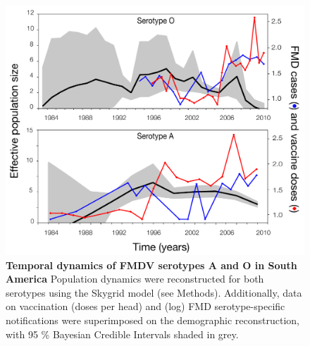 \documentclass[10pt]{article}
\begin{document}
\begin{figure}[!ht]
\begin{center}
\includegraphics[scale=1.0]{FIGURES/skygrid.pdf}
\end{center}
\caption{
{\bf Temporal dynamics of FMDV serotypes A and O in South America} Population dynamics were reconstructed for both serotypes using the Skygrid model (see Methods). Additionally, data on vaccination  (doses per head) and (log) FMD serotype-specific notifications were superimposed on the demographic reconstruction, with 95 \% Bayesian Credible Intervals shaded in grey.\\
}
\label{fig:skygrid}
\end{figure}
\newpage
\end{document}
